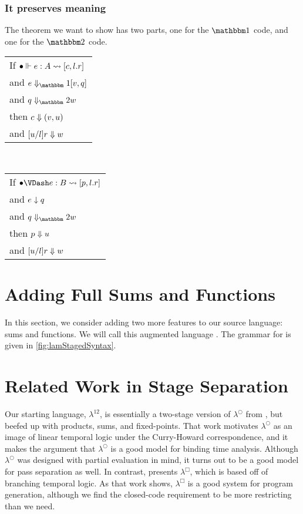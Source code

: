 \documentclass{article}
\begin{document}
\subsubsection{It preserves meaning}

The theorem we want to show has two parts, one for the $\bbone$ code, and one for the $\bbtwo$ code.  
\begin{center}
\begin{tabular}{l}
If $\splitone [\emptyC]{e}{A}{c,l.r}$ \\
and $\rsone{e}{v}{q}$ \\
and $\reducetwo{q}{w}$ \\
then $\reduce{c}{\valprod{v}{u}}$ \\
and $\reduce{[u/l]r}{w}$
\end{tabular}
~~~
\begin{tabular}{l}
If $\splittwo[\emptyC]{e}{B}{p,l.r}$ \\
and $\rstwo{e}{q}$ \\
and $\reducetwo{q}{w}$ \\
then $\reduce{p}{u}$ \\
and $\reduce{[u/l]r}{w}$ 
\end{tabular}
\end{center}


\section {Adding Full Sums and Functions}

In this section, we consider adding two more features to our source language: sums and functions.  We will call this augmented language \lamStaged.  The grammar for \lamStaged is given in \ref{fig:lamStagedSyntax}.



\section{Related Work in Stage Separation}

Our starting language, $\lambda^{12}$, is essentially a two-stage version of $\lambda^\bigcirc$ from \cite{davies96}, but beefed up with products, sums, and fixed-points.  That work motivates $\lambda^\bigcirc$ as an image of linear temporal logic under the Curry-Howard correspondence, and it makes the argument that $\lambda^\bigcirc$ is a good model for binding time analysis.  Although $\lambda^\bigcirc$ was designed with partial evaluation in mind, it turns out to be a good model for pass separation as well.  In contrast, \cite{davies01} presents $\lambda^\Box$, which is based off of branching temporal logic.  As that work shows, $\lambda^\Box$ is a good system for program generation, although we find the closed-code requirement to be more restricting than we need.
\end{document}
